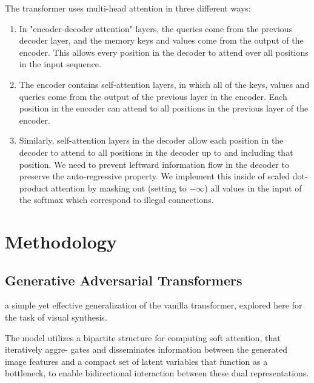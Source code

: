 \documentclass{article}
\begin{document}
	The transformer uses multi-head attention in three different ways:
	\begin{enumerate}
		\item In "encoder-decoder attention" layers, the queries come from the previous decoder layer, 
		and the memory keys and values come from the output of the encoder. This allows every position 
		in the decoder to attend over all positions in the input sequence.
		\item The encoder contains self-attention layers, in which all of the keys, values 
		and queries come from the output of the previous layer in the encoder. 
		Each position in the encoder can attend to all positions in the previous layer of the encoder.
		\item Similarly, self-attention layers in the decoder allow each position in the decoder to attend to 
		all positions in the decoder up to and including that position. We need to prevent leftward 
		information flow in the decoder to preserve the auto-regressive property. We implement this 
		inside of scaled dot-product attention by masking out (setting to $-\infty$) all values in the input 
		of the softmax which correspond to illegal connections. 
	\end{enumerate}

	
	\section{Methodology}
	
	\subsection{Generative Adversarial Transformers}
	\cite{hudson2021generative}
	
	a simple yet effective generalization of the vanilla transformer, explored here for the task of visual 
	synthesis. 
	
	The model utilizes a bipartite structure for computing soft attention, that iteratively aggre- gates 
	and disseminates information between the generated image features and a compact set of latent 
	variables that function as a bottleneck, to enable bidirectional interaction between these dual 
	representations. 
	
\end{document}
